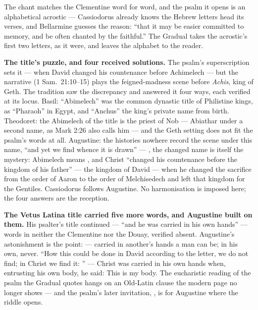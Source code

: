 The chant matches the Clementine word for word, and the psalm it opens is an
alphabetical acrostic --- Cassiodorus already knows the Hebrew letters head
its verses, and Bellarmine guesses the reason: ``that it may be easier
committed to memory, and be often chanted by the faithful.'' The Gradual
takes the acrostic's first two letters, as it were, and leaves the alphabet
to the reader.

\textbf{The title's puzzle, and four received solutions.} The psalm's
superscription sets it  ---
when David changed his countenance before Achimelech --- but the narrative
(1 Sam.\ 21:10--15) plays the feigned-madness scene before \textit{Achis},
king of Geth. The tradition saw the discrepancy and answered it four ways,
each verified at its locus. Basil: ``Abimelech'' was the common dynastic
title of Philistine kings, as ``Pharaoh'' in Egypt, and ``Anchus'' the
king's private name from birth. Theodoret: the Abimelech of the title is the
priest of Nob --- Abiathar under a second name, as Mark 2:26 also calls him
--- and the Geth setting does not fit the psalm's words at all. Augustine:
the histories nowhere record the scene under this name, ``and yet we find
whence it is drawn'' --- , the changed
name is itself the mystery: Abimelech means , and
Christ ``changed his countenance before the kingdom of his father'' --- the
kingdom of David --- when he changed the sacrifice from the order of Aaron to
the order of Melchisedech and left that kingdom for the Gentiles. Cassiodorus
follows Augustine. No harmonisation is imposed here; the four answers are the
reception.

\textbf{The Vetus Latina title carried five more words, and Augustine built
on them.} His psalter's title continued 
--- ``and he was carried in his own hands'' --- words in neither the
Clementine nor the Douay, verified absent. Augustine's astonishment is the
point:  --- carried in another's hands a man can be; in his own,
never. ``How this could be done in David according to the letter, we do not
find; in Christ we find it: '' --- Christ
was carried in his own hands when, entrusting his own body, he said: This is
my body. The eucharistic reading of the psalm the Gradual quotes hangs on an
Old-Latin clause the modern page no longer shows --- and the psalm's later
invitation, , is for Augustine where the riddle
opens.


